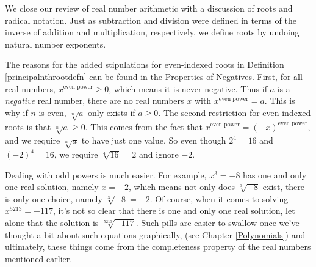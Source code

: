 \medskip

We close our review of real number arithmetic with a discussion of roots and radical notation.  Just as subtraction and division were defined in terms of the inverse of addition and multiplication, respectively, we define roots by undoing natural number exponents.

\medskip




\medskip

The reasons for the added stipulations for even-indexed roots in Definition \ref{principalnthrootdefn} can be found in the Properties of Negatives.  First, for all real numbers,  $x^{\text{even power}} \geq 0$, which means it is never negative.  Thus if $a$ is a \textit{negative} real number, there are no real numbers $x$ with $x^{\text{even power}} = a$.  This is why if $n$ is even, $\sqrt[n]{a}$ only exists if $a \geq 0$.  The second restriction for even-indexed roots is that $\sqrt[n]{a} \geq 0$.  This comes from the fact that $x^{\text{even power}} = (-x)^{\text{even power}}$, and we require $\sqrt[n]{a}$ to have just one value.  So even though $2^{4} = 16$ and $(-2)^{4} = 16$, we require $\sqrt[4]{16} = 2$ and ignore $-2$.  

\smallskip

Dealing with odd powers is much easier. For example, $x^3 = -8$ has one and only one real solution, namely $x = -2$, which means not only does $\sqrt[3]{-8}$ exist, there is only one choice, namely $\sqrt[3]{-8} = -2$. Of course, when it comes to solving $x^{5213} = -117$, it's not so clear that there is one and only one real solution, let alone that the solution is $\sqrt[5213]{-117}$. Such pills are easier to swallow once we've thought a bit about such equations graphically, (see Chapter \ref{Polynomials}) and ultimately, these things come from the completeness property of the real numbers mentioned earlier.  

